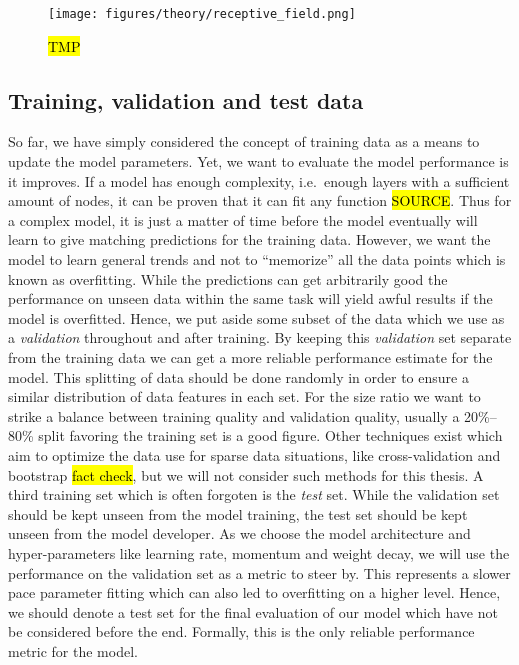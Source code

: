 \begin{figure}[H]
  \centering
  \texttt{[image: figures/theory/receptive\_field.png]}
  \caption{\hl{TMP}}
  \label{fig:receptive_field}
\end{figure}

\subsection{Training, validation and test data}
So far, we have simply considered the concept of training data as a means to
update the model parameters. Yet, we want to evaluate the model performance is
it improves. If a model has enough complexity, i.e.\ enough layers with a
sufficient amount of nodes, it can be proven that it can fit any function
\hl{SOURCE}. Thus for a complex model, it is just a matter of time before the
model eventually will learn to give matching predictions for the training data.
However, we want the model to learn general trends and not to ``memorize'' all
the data points which is known as overfitting. While the predictions can get
arbitrarily good the performance on unseen data within the same task will yield
awful results if the model is overfitted. Hence, we put aside some subset of the
data which we use as a \textit{validation} throughout and after training. By
keeping this \textit{validation} set separate from the training data we can get
a more reliable performance estimate for the model. This splitting of data
should be done randomly in order to ensure a similar distribution of data
features in each set. For the size ratio we want to strike a balance between
training quality and validation quality, usually a 20\%--80\% split favoring the
training set is a good figure. Other techniques exist which aim to optimize the
data use for sparse data situations, like cross-validation and bootstrap
\hl{fact check}, but we will not consider such methods for this thesis. A third
training set which is often forgoten is the \textit{test} set. While the
validation set should be kept unseen from the model training, the test set
should be kept unseen from the model developer. As we choose the model
architecture and hyper-parameters like learning rate, momentum and weight decay,
we will use the performance on the validation set as a metric to steer by. This
represents a slower pace parameter fitting which can also led to overfitting on
a higher level. Hence, we should denote a test set for the final evaluation of
our model which have not be considered before the end. Formally, this is the
only reliable performance metric for the model. 



